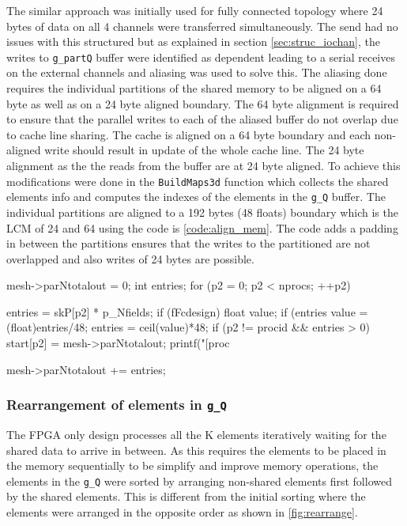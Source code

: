 The similar approach was initially used for fully connected topology where
24 bytes of data on all 4 channels were transferred simultaneously. The send had
no issues with this structured but as explained in section \ref{sec:struc_iochan},
the writes to \texttt{g\_partQ} buffer were identified as dependent leading
to a serial receives on the external channels and aliasing was used to solve this.
The aliasing done requires the individual partitions of the shared memory to be aligned
on a 64 byte as well as on a 24 byte aligned boundary. The 64 byte alignment is required
to ensure that the parallel writes to each of the aliased buffer do not overlap due to
cache line sharing. The cache is aligned on a 64 byte boundary and each non-aligned
write should result in update of the whole cache line. The 24 byte alignment as the
the reads from the buffer are at 24 byte aligned. To achieve this modifications
were done in the \texttt{BuildMaps3d} function which collects the shared elements info and computes
the indexes of the elements in the \texttt{g\_Q} buffer. The individual partitions
are aligned to a 192 bytes (48 floats) boundary which is the \ac{LCM} of 24 and 64 using the code
is \ref{code:align_mem}. The code adds a padding in between the partitions ensures
that the writes to the partitioned are not overlapped and also writes of 24 bytes are
possible.

\begin{CppCode}[caption=Alignment code introduced to ensure non-overlap writes of the
    aliased buffers, frame=tlrb, label=code:align_mem]
mesh->parNtotalout = 0;
int entries;
for (p2 = 0; p2 < nprocs; ++p2)
{
    entries = skP[p2] * p_Nfields;
    if (fFcdesign)
    {
        float value;
        if (entries%
        {
            value = (float)entries/48;
            entries = ceil(value)*48;
        }
        if (p2 != procid && entries > 0)
            start[p2] = mesh->parNtotalout;
            printf("[proc %
    }

    mesh->parNtotalout += entries;
}
\end{CppCode}

\subsubsection*{Rearrangement of elements in \texttt{g\_Q}}

The FPGA only design processes all the K elements iteratively waiting
for the shared data to arrive in between. As this requires the elements
to be placed in the memory sequentially to be simplify and improve memory
operations, the elements in the \texttt{g\_Q} were sorted by arranging
non-shared elements first followed by the shared elements. This is different
from the initial sorting where the elements were arranged in the opposite order
as shown in \ref{fig:rearrange}.

